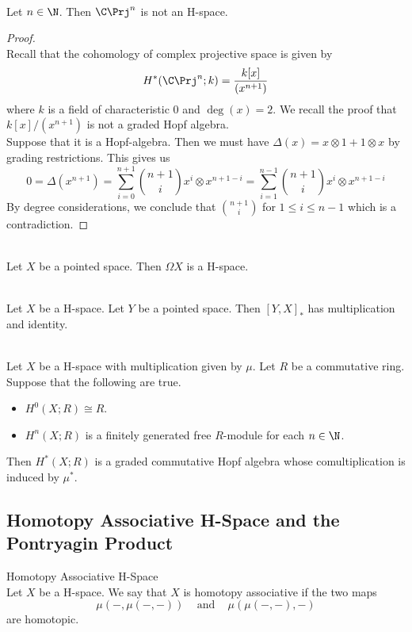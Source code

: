 \documentclass[a4paper]{article}
\begin{document}
\begin{eg}{}{}\\
Let $n\in\N$. Then $\C\Prj^n$ is not an H-space. 
\begin{proof}\\
Recall that the cohomology of complex projective space is given by $$H^\ast(\C\Prj^n;k)=\frac{k[x]}{(x^{n+1})}$$ where $k$ is a field of characteristic $0$ and $\deg(x)=2$. We recall the proof that $k[x]/(x^{n+1})$ is not a graded Hopf algebra. \\

Suppose that it is a Hopf-algebra. Then we must have $\Delta(x)=x\otimes 1+1\otimes x$ by grading restrictions. This gives us $$0=\Delta(x^{n+1})=\sum_{i=0}^{n+1}\binom{n+1}{i}x^i\otimes x^{n+1-i}=\sum_{i=1}^{n-1}\binom{n+1}{i}x^i\otimes x^{n+1-i}$$ By degree considerations, we conclude that $\binom{n+1}{i}$ for $1\leq i\leq n-1$ which is a contradiction. 
\end{proof}
\end{eg}

\begin{eg}{}{}\\
Let $X$ be a pointed space. Then $\Omega X$ is a H-space. 
\end{eg}

\begin{lmm}{}{}\\
Let $X$ be a H-space. Let $Y$ be a pointed space. Then $[Y,X]_\ast$ has multiplication and identity. 
\end{lmm}

\begin{prp}{}{}\\
Let $X$ be a H-space with multiplication given by $\mu$. Let $R$ be a commutative ring. Suppose that the following are true. 
\begin{itemize}
\item $H^0(X;R)\cong R$. 
\item $H^n(X;R)$ is a finitely generated free $R$-module for each $n\in\N$. 
\end{itemize}
Then $H^\ast(X;R)$ is a graded commutative Hopf algebra whose comultiplication is induced by $\mu^\ast$. 
\end{prp}

\subsection{Homotopy Associative H-Space and the Pontryagin Product}
\begin{defn}{Homotopy Associative H-Space}{}\\
Let $X$ be a H-space. We say that $X$ is homotopy associative if the two maps $$\mu(-,\mu(-,-))\;\;\;\text{ and }\;\;\;\mu(\mu(-,-),-)$$ are homotopic. 
\end{defn}
\end{document}
